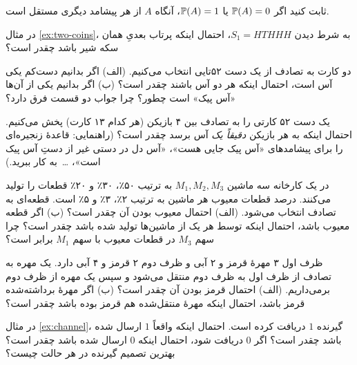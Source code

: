 \begin{exercise}
ثابت کنید اگر $\P(A)=0$ یا $\P(A)=1$، آنگاه $A$ از هر پیشامد دیگری مستقل است.
\end{exercise}

\begin{exercise}
در مثال \ref{ex:two-coins}، به شرط دیدن $S_1=HTHHH$، احتمال اینکه پرتاب بعدیِ همان سکه شیر باشد چقدر است؟
\end{exercise}

\begin{exercise}[دو کارت و آس]
دو کارت به تصادف از یک دست ۵۲تایی انتخاب می‌کنیم. (الف) اگر بدانیم دست‌کم یکی آس است، احتمال اینکه هر دو آس باشند چقدر است؟ (ب) اگر بدانیم یکی از آن‌ها «آس پیک» است چطور؟ چرا جواب دو قسمت فرق دارد؟
\end{exercise}

\begin{exercise}
یک دست ۵۲ کارتی را به تصادف بین ۴ بازیکن (هر کدام ۱۳ کارت) پخش می‌کنیم. احتمال اینکه به هر بازیکن \emph{دقیقاً یک} آس برسد چقدر است؟ (راهنمایی: قاعدهٔ زنجیره‌ای را برای پیشامدهای «آس پیک جایی هست»، «آس دل در دستی غیر از دستِ آس پیک است»، \dots\ به کار ببرید.)
\end{exercise}

\begin{exercise}
در یک کارخانه سه ماشین $M_1,M_2,M_3$ به ترتیب ۵۰٪، ۳۰٪ و ۲۰٪ قطعات را تولید می‌کنند. درصد قطعات معیوب هر ماشین به ترتیب ۲٪، ۳٪ و ۵٪ است. قطعه‌ای به تصادف انتخاب می‌شود.
(الف) احتمال معیوب بودن آن چقدر است؟
(ب) اگر قطعه معیوب باشد، احتمال اینکه توسط هر یک از ماشین‌ها تولید شده باشد چقدر است؟ چرا سهم $M_3$ در قطعات معیوب با سهم $M_1$ برابر است؟
\end{exercise}

\begin{exercise}
ظرف اول ۳ مهرهٔ قرمز و ۲ آبی و ظرف دوم ۲ قرمز و ۴ آبی دارد. یک مهره به تصادف از ظرف اول به ظرف دوم منتقل می‌شود و سپس یک مهره از ظرف دوم برمی‌داریم. (الف) احتمال قرمز بودن آن چقدر است؟ (ب) اگر مهرهٔ برداشته‌شده قرمز باشد، احتمال اینکه مهرهٔ منتقل‌شده هم قرمز بوده باشد چقدر است؟
\end{exercise}

\begin{exercise}
در مثال \ref{ex:channel}، گیرنده $1$ دریافت کرده است. احتمال اینکه واقعاً $1$ ارسال شده باشد چقدر است؟ اگر $0$ دریافت شود، احتمال اینکه $0$ ارسال شده باشد چقدر است؟ بهترین تصمیم گیرنده در هر حالت چیست؟
\end{exercise}


